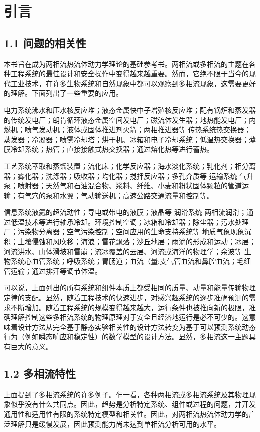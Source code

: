 \documentclass[11pt,a4paper,openany,fontset=none]{ctexbook}
\begin{document}
\chapter{引言}
\section*{1.1 问题的相关性}
本书旨在成为两相流热流体动力学理论的基础参考书。两相流或多相流的主题在各种工程系统的最佳设计和安全操作中变得越来越重要。然而，它绝不限于当今的现代工业技术，在许多生物系统和自然现象中都可以观察到多相流现象，这需要更好的理解。下面列出了一些重要的应用。

电力系统沸水和压水核反应堆；液态金属快中子增殖核反应堆；配有锅炉和蒸发器的传统发电厂；朗肯循环液态金属空间发电厂；磁流体发生器；地热能发电厂；内燃机；喷气发动机；液体或固体推进剂火箭；两相推进器等
传热系统热交换器；蒸发器；冷凝器；喷雾冷却塔；烘干机、冰箱和电子冷却系统；低温热交换器；薄膜冷却系统；热管；直接接触式热交换器；通过熔化热等进行蓄热。

工艺系统萃取和蒸馏装置；流化床；化学反应器；海水淡化系统；乳化剂；相分离器；雾化器；洗涤器；吸收器；均化器；搅拌反应器；多孔介质等
运输系统 气升泵；喷射器；天然气和石油混合物、浆料、纤维、小麦和粉状固体颗粒的管道运输；有气穴的泵和水翼；气动输送机；高速公路交通流量和控制等。

信息系统液氦的超流动性；导电或带电的液膜；液晶等
润滑系统 两相流润滑；通过低温技术等进行轴承冷却。环境控制空调；冰箱和冷却器；除尘器；污水处理厂；污染物分离器；空气污染控制；空间应用的生命支持系统等
地质气象现象沉积；土壤侵蚀和风吹移；海浪；雪花飘落；沙丘地层；雨滴的形成和运动；冰层；河流洪水、山体滑坡和雪崩；流冰覆盖的云层、河流或海洋的物理学；余波等
生物系统心血管系统；呼吸系统；胃肠道；血流（量;支气管血流和鼻腔血流；毛细管运输；通过排汗等调节体温。

可以说，上面列出的所有系统和组件本质上都受相同的质量、动量和能量传输物理定律的支配。显然，随着工程技术的快速进步，对感兴趣系统的逐步准确预测的需求不断增加。随着工程系统的规模变得越来越大，运行条件​​也被推向新的极限，准确理解控制这些多相流系统的物理原理对于安全且经济地运行是必不可少的。这意味着设计方法从完全基于静态实验相关性的设计方法转变为基于可以预测系统动态行为（例如瞬态响应和稳定性）的数学模型的设计方法。显然，多相流这一主题具有巨大的意义。

\section*{1.2 多相流特性}
上面提到了多相流系统的许多例子。乍一看，各种两相流或多相流系统及其物理现象似乎没有什么共同点。因此，趋势是分析特定系统、组件或过程的问题，并开发通用性和适用性有限的系统特定模型和相关性。因此，对两相流热流体动力学的广泛理解只是缓慢发展，因此预测能力尚未达到单相流分析可用的水平。
\end{document}
